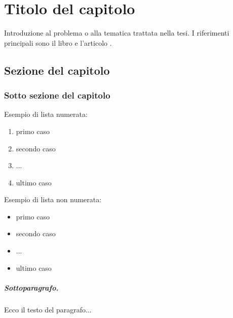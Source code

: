 \chapter{Titolo del capitolo}\label{chap:1}
Introduzione al problema o alla tematica trattata nella tesi.
I riferimenti principali sono il libro \cite{dantzig2016linear} e l'articolo \cite{dantzig1960decomposition}.


\section{Sezione del capitolo}\label{sec:nomeDaRicordare}

\subsection{Sotto sezione del capitolo}\label{sec:nomeDaRicordare}

Esempio di lista numerata:
\begin{enumerate}
\item primo caso
\item secondo caso
\item ...
\item ultimo caso
\end{enumerate}

Esempio di lista non numerata:
\begin{itemize}
\item primo caso
\item secondo caso
\item ...
\item ultimo caso
\end{itemize}

\paragraph{Sottoparagrafo.} Ecco il testo del paragrafo...